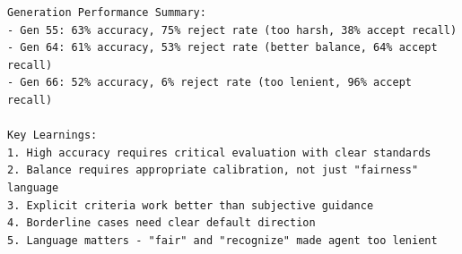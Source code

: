 \begin{verbatim}
Generation Performance Summary:
- Gen 55: 63% accuracy, 75% reject rate (too harsh, 38% accept recall)
- Gen 64: 61% accuracy, 53% reject rate (better balance, 64% accept recall)
- Gen 66: 52% accuracy, 6% reject rate (too lenient, 96% accept recall)

Key Learnings:
1. High accuracy requires critical evaluation with clear standards
2. Balance requires appropriate calibration, not just "fairness" language
3. Explicit criteria work better than subjective guidance
4. Borderline cases need clear default direction
5. Language matters - "fair" and "recognize" made agent too lenient
\end{verbatim}